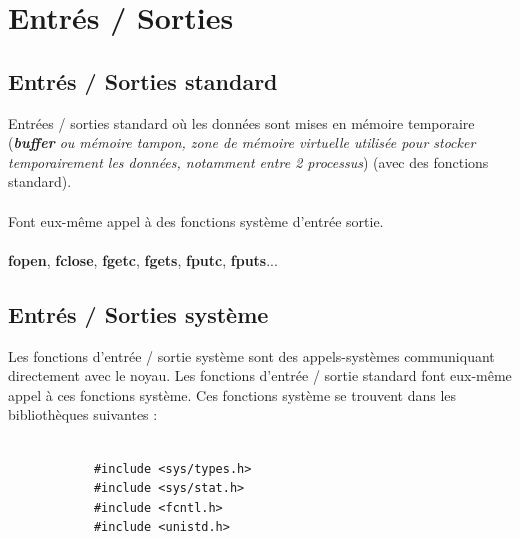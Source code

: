 		
	\section{Entrés / Sorties}
	\subsection{Entrés / Sorties standard}
		\begin{frame}
			Entrées / sorties standard où les données sont mises en mémoire temporaire (\textit{\textbf{buffer} ou mémoire tampon, zone de mémoire virtuelle utilisée pour stocker temporairement les données, notamment entre 2 processus}) (avec des fonctions standard).
			\\~\\
			Font eux-même appel à des fonctions système d'entrée sortie.
			\\~\\
			\textbf{fopen}, \textbf{fclose}, \textbf{fgetc}, \textbf{fgets}, \textbf{fputc}, \textbf{fputs}...
		\end{frame}	
		
	\subsection{Entrés / Sorties système}
		\begin{frame}[containsverbatim]
			Les fonctions d'entrée / sortie système sont des appels-systèmes communiquant directement avec le noyau. Les fonctions d'entrée / sortie standard font eux-même appel à ces fonctions système. Ces fonctions système se trouvent dans les bibliothèques suivantes :
			\\~\\
			\begin{lstlisting}
			#include <sys/types.h>
			#include <sys/stat.h>
			#include <fcntl.h>
			#include <unistd.h>
			\end{lstlisting}
		\end{frame}	
		
